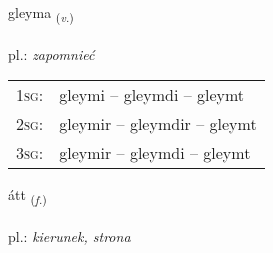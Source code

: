 \documentclass[frontgrid, backgrid]{flacards}\usepackage[]{graphicx}\usepackage[]{xcolor}
\begin{document}
\renewcommand{\flhead}{\vskip5pt \fboxsep=0pt {\small\bfseries\footnotesize Sagnorð | Verb}}
\renewcommand{\fcfoot}{\vskip5pt \fboxsep=0pt \hspace{2pt}{\small\bfseries\footnotesize 1K}}

\renewcommand{\blhead}{\vskip5pt {\small\bfseries\footnotesize Sagnorð | Verb }}
\renewcommand{\bcfoot}{\vskip5pt \hspace{2pt}{\small\bfseries\footnotesize 1K}}


{gleyma \small{\textsubscript{(\textit{v.})}} \\[1ex] %
\textphonetic{[kleiːma]} \\
pl.: \emph{zapomnieć} \\  [2ex]
\renewcommand*{\arraystretch}{0.8}
\begin{tabular}{p{1cm}l}
\textsc{1sg}: & gleymi -- gleymdi -- gleymt \\ 
\textsc{2sg}: & gleymir -- gleymdir -- gleymt \\ 
\textsc{3sg}: & gleymir -- gleymdi -- gleymt \\ 
\end{tabular}
}

\renewcommand{\flhead}{\vskip5pt \fboxsep=0pt {\small\bfseries\footnotesize Nafnorð | Noun}}
\renewcommand{\fcfoot}{\vskip5pt \fboxsep=0pt \hspace{2pt}{\small\bfseries\footnotesize 1K}}

\renewcommand{\blhead}{\vskip5pt {\small\bfseries\footnotesize Nafnorð | Noun }}
\renewcommand{\bcfoot}{\vskip5pt \hspace{2pt}{\small\bfseries\footnotesize 1K}}


{átt \small{\textsubscript{(\textit{f.})}} \\[1ex] %
\textphonetic{[auht]} \\
pl.: \emph{kierunek, strona} \\  [2ex]
\renewcommand*{\arraystretch}{0.8}
}
\end{document}
